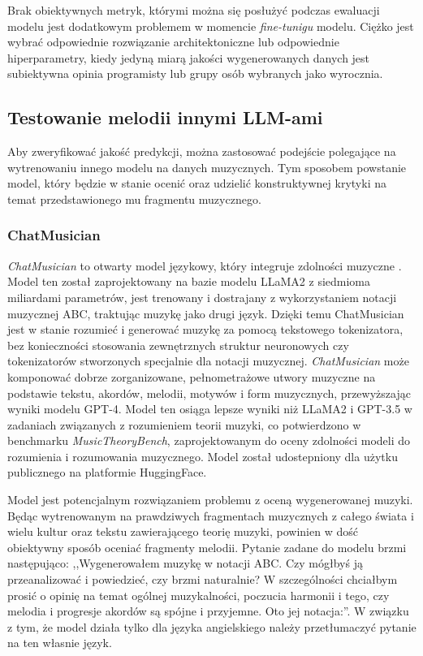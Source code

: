 \documentclass[data-science]{agh-wi} %
\begin{document}
Brak obiektywnych metryk, którymi można się posłużyć podczas ewaluacji modelu jest dodatkowym problemem w momencie \textit{fine-tunigu} modelu. Ciężko jest wybrać odpowiednie rozwiązanie architektoniczne lub odpowiednie hiperparametry, kiedy jedyną miarą jakości wygenerowanych danych jest subiektywna opinia programisty lub grupy osób wybranych jako wyrocznia.

\subsection{Testowanie melodii innymi LLM-ami}
Aby zweryfikować jakość predykcji, można zastosować podejście polegające na wytrenowaniu innego modelu na danych muzycznych. Tym sposobem powstanie model, który będzie w stanie ocenić oraz udzielić konstruktywnej krytyki na temat przedstawionego mu fragmentu muzycznego.
\subsubsection*{ChatMusician}
\textit{ChatMusician} to otwarty model językowy, który integruje zdolności muzyczne \cite{yuan2024chatmusician}. Model ten został zaprojektowany na bazie modelu LLaMA2 z siedmioma miliardami parametrów, jest trenowany i dostrajany z wykorzystaniem notacji muzycznej ABC, traktując muzykę jako drugi język. Dzięki temu ChatMusician jest w stanie rozumieć i generować muzykę za pomocą tekstowego tokenizatora, bez konieczności stosowania zewnętrznych struktur neuronowych czy tokenizatorów stworzonych specjalnie dla notacji muzycznej. \textit{ChatMusician} może komponować dobrze zorganizowane, pełnometrażowe utwory muzyczne na podstawie tekstu, akordów, melodii, motywów i form muzycznych, przewyższając wyniki modelu GPT-4. Model ten osiąga lepsze wyniki niż LLaMA2 i GPT-3.5 w zadaniach związanych z rozumieniem teorii muzyki, co potwierdzono w benchmarku \textit{MusicTheoryBench}, zaprojektowanym do oceny zdolności modeli do rozumienia i rozumowania muzycznego. Model został udostepniony dla użytku publicznego na platformie HuggingFace.

Model jest potencjalnym rozwiązaniem problemu z oceną wygenerowanej muzyki. Będąc wytrenowanym na prawdziwych fragmentach muzycznych z całego świata i wielu kultur oraz tekstu zawierającego teorię muzyki, powinien w dość obiektywny sposób oceniać fragmenty melodii. Pytanie zadane do modelu brzmi następująco: ,,Wygenerowałem muzykę w notacji ABC. Czy mógłbyś ją przeanalizować i powiedzieć, czy brzmi naturalnie? W szczególności chciałbym prosić o opinię na temat ogólnej muzykalności, poczucia harmonii i tego, czy melodia i progresje akordów są spójne i przyjemne. Oto jej notacja:''. W związku z tym, że model działa tylko dla języka angielskiego należy przetłumaczyć pytanie na ten własnie język.
\end{document}
